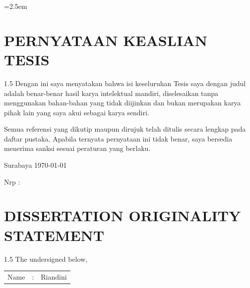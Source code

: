 \normalsize
{}
\singlespacing
\emergencystretch=2.5em

\cleardoublepage

\cleardoublepage

{
	{
		\chapter*{PERNYATAAN KEASLIAN TESIS}
		
		\begin{spacing}{1.5}
			Dengan ini saya menyatakan bahwa isi keseluruhan Tesis saya dengan judul \textbf{\JdTesis} adalah benar-benar hasil karya intelektual mandiri, diselesaikan tanpa menggunakan bahan-bahan yang tidak diijinkan dan bukan merupakan karya pihak lain yang saya akui sebagai karya sendiri.
			
			Semua referensi yang dikutip maupun dirujuk telah ditulis secara lengkap pada daftar pustaka. Apabila ternyata pernyataan ini tidak benar, saya bersedia menerima sanksi sesuai peraturan yang berlaku.
			
			\hspace{30ex}Surabaya \today
			
			\vspace{10ex}
			
			\hspace{35ex}\underline{\NamaMahasiswa}
			
			\hspace{35ex}Nrp :\NrpMahasiswa
		\end{spacing}
		\cleardoublepage
	}
	{	
		\chapter*{DISSERTATION ORIGINALITY STATEMENT}
		
		\begin{spacing}{1.5}
			The undersigned below,
			
			\vspace{0.2cm}
			
			\begin{tabularx}{\textwidth}{@{}p{3.2cm}p{0.3cm}>{\raggedright\arraybackslash}X@{}}
			Name
			& : & Riandini \\
			

\end{tabularx}
\end{spacing}}}
